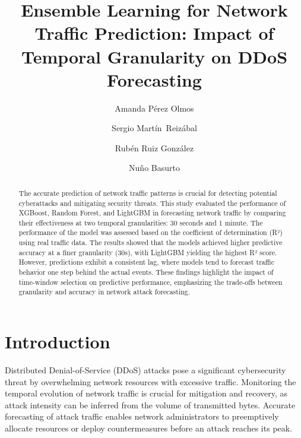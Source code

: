 \documentclass[runningheads]{llncs}
\begin{document}
\title{Ensemble Learning for Network Traffic Prediction: Impact of Temporal Granularity on DDoS Forecasting}

\author{Amanda P\'erez Olmos \and Sergio Mart\'in~Reiz\'abal  \and Rub\'{e}n Ruiz Gonz\'{a}lez \and Nu{\~n}o Basurto}
%
\maketitle
%
\begin{abstract}
The accurate prediction of network traffic patterns is crucial for detecting potential cyberattacks and mitigating security threats. This study evaluated the performance of XGBoost, Random Forest, and LightGBM in forecasting network traffic by comparing their effectiveness at two temporal granularities: 30 seconds and 1 minute. The performance of the model was assessed based on the coefficient of determination (R²) using real traffic data. The results showed that the models achieved higher predictive accuracy at a finer granularity (30s), with LightGBM yielding the highest R² score. However, predictions exhibit a consistent lag, where models tend to forecast traffic behavior one step behind the actual events. These findings highlight the impact of time-window selection on predictive performance, emphasizing the trade-offs between granularity and accuracy in network attack forecasting.

\end{abstract}
%
%
%
%
%
%
%
\section{Introduction}
Distributed Denial-of-Service (DDoS) attacks pose a significant cybersecurity threat by overwhelming network resources with excessive traffic. Monitoring the temporal evolution of network traffic is crucial for mitigation and recovery, as attack intensity can be inferred from the volume of transmitted bytes. Accurate forecasting of attack traffic enables network administrators to preemptively allocate resources or deploy countermeasures before an attack reaches its peak.
\end{document}
